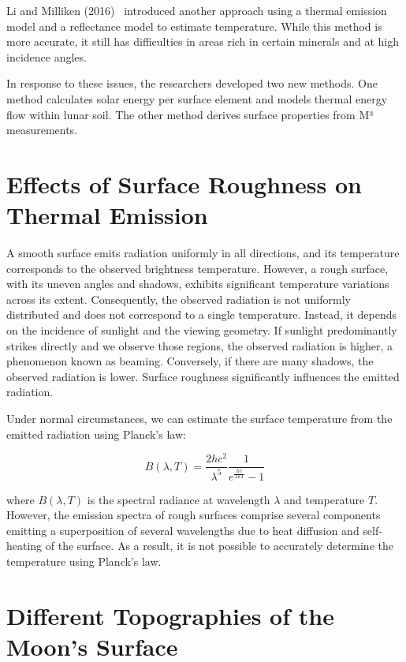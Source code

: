 \documentclass{optica-article}
\begin{document}
Li and Milliken (2016)~\cite{li_empirical_2016} introduced another approach using a thermal emission 
model and a reflectance model to estimate temperature. While this method is 
more accurate, it still has difficulties in areas rich in certain minerals 
and at high incidence angles.

In response to these issues, the researchers developed two new methods. 
One method calculates solar energy per surface element and models thermal energy 
flow within lunar soil. The other method derives surface properties 
from M³ measurements.

\section{Effects of Surface Roughness on Thermal Emission}

A smooth surface emits radiation uniformly in all directions, and its temperature 
corresponds to the observed brightness temperature. However, a rough surface, 
with its uneven angles and shadows, 
exhibits significant temperature variations across its extent. Consequently,
 the observed radiation is not uniformly distributed and does not correspond to 
 a single temperature. Instead, it depends on the incidence of sunlight and the 
 viewing geometry. If sunlight predominantly strikes directly and we observe those
  regions, the observed radiation is higher, a phenomenon known as beaming. 
  Conversely, if there are many shadows, the observed radiation is lower. 
  Surface roughness significantly influences the emitted radiation.

Under normal circumstances, we can estimate the surface temperature from the 
emitted radiation using Planck's law:

\begin{equation}
B(\lambda,T) = \frac{2hc^2}{\lambda^5} \frac{1}{e^{\frac{hc}{\lambda kT}} - 1}
\end{equation}

where $B(\lambda,T)$ is the spectral radiance at wavelength $\lambda$ and 
temperature $T$.
However, the emission spectra of rough surfaces comprise several components 
emitting a superposition of several wavelengths due to heat diffusion and 
self-heating of the surface. As a result, it is not possible to accurately 
determine the temperature using Planck's law.


\section{Different Topographies of the Moon's Surface}
\end{document}
